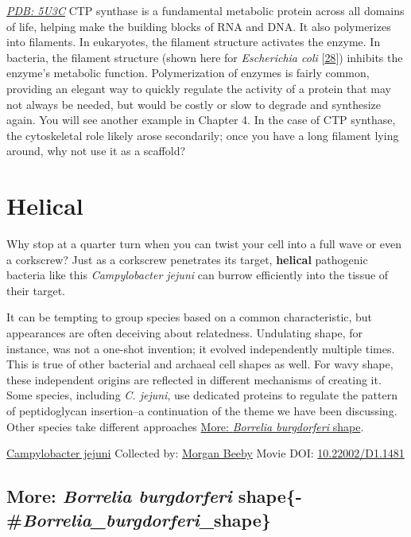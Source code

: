 \documentclass[]{tufte-book}
\begin{document}
\href{http://rcsb.org/structure/5U3C}{\emph{PDB: 5U3C}}
CTP synthase is a fundamental metabolic protein across all domains of life, helping make the building blocks of RNA and DNA. It also polymerizes into filaments. In eukaryotes, the filament structure activates the enzyme. In bacteria, the filament structure (shown here for \emph{Escherichia coli} {[}\protect\hyperlink{ref-lynch2017}{28}{]}) inhibits the enzyme's metabolic function. Polymerization of enzymes is fairly common, providing an elegant way to quickly regulate the activity of a protein that may not always be needed, but would be costly or slow to degrade and synthesize again. You will see another example in Chapter 4. In the case of CTP synthase, the cytoskeletal role likely arose secondarily; once you have a long filament lying around, why not use it as a scaffold?

\hypertarget{helical}{%
\section{Helical}\label{helical}}

Why stop at a quarter turn when you can twist your cell into a full wave or even a corkscrew? Just as a corkscrew penetrates its target, \textbf{helical} pathogenic bacteria like this \emph{Campylobacter jejuni} can burrow efficiently into the tissue of their target.

It can be tempting to group species based on a common characteristic, but appearances are often deceiving about relatedness. Undulating shape, for instance, was not a one-shot invention; it evolved independently multiple times. This is true of other bacterial and archaeal cell shapes as well. For wavy shape, these independent origins are reflected in different mechanisms of creating it. Some species, including \emph{C. jejuni}, use dedicated proteins to regulate the pattern of peptidoglycan insertion--a continuation of the theme we have been discussing. Other species take different approaches \protect\hyperlink{ux2aBorrelia_burgdorferiux2a_shape}{More: \emph{Borrelia burgdorferi} shape}.



\hypertarget{htmlwidget-62b68569c08d6e194632}{}

\label{fig:3-5}\protect\hyperlink{tree}{Campylobacter jejuni} Collected by: \protect\hyperlink{morgan_beeby}{Morgan Beeby} Movie DOI: \href{https://doi.org/10.22002/D1.1481}{10.22002/D1.1481}

\hypertarget{more-borrelia-burgdorferi-shape-borrelia_burgdorferi_shape}{%
\subsection{\texorpdfstring{More: \emph{Borrelia burgdorferi} shape\{-\#\emph{Borrelia\_burgdorferi}\_shape\}}{More: Borrelia burgdorferi shape\{-\#Borrelia\_burgdorferi\_shape\}}}\label{more-borrelia-burgdorferi-shape-borrelia_burgdorferi_shape}}
\end{document}
